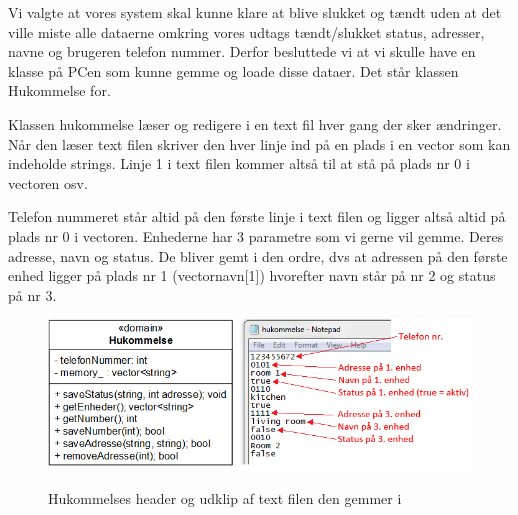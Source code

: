 Vi valgte at vores system skal kunne klare at blive slukket og tændt uden at det ville miste alle dataerne omkring vores udtags tændt/slukket status, adresser, navne og brugeren telefon nummer. Derfor besluttede vi at vi skulle have en klasse på PCen som kunne gemme og loade disse dataer. Det står klassen Hukommelse for.
\medskip

Klassen hukommelse læser og redigere i en text fil hver gang der sker ændringer. Når den læser text filen skriver den hver linje ind på en plads i en vector som kan indeholde strings. Linje 1 i text filen kommer altså til at stå på plads nr 0 i vectoren osv.

\medskip
Telefon nummeret står altid på den første linje i text filen og ligger altså altid på plads nr 0 i vectoren. Enhederne har 3 parametre som vi gerne vil gemme. Deres adresse, navn og status. De bliver gemt i den ordre, dvs at adressen på den første enhed ligger på plads nr 1 (vectornavn[1]) hvorefter navn står på nr 2 og status på nr 3.\\

\begin{figure}[!htb]
     {\includegraphics[width=\textwidth]{billeder/uml/PC_dataview}}
     \caption{Hukommelses header og udklip af text filen den gemmer i}
     \label{fig:PC_dataview}
\end{figure}